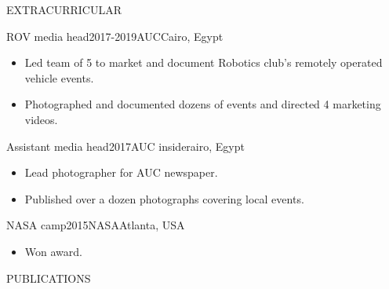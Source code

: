 \documentclass{resume}
\begin{document}
\begin{minipage}[t]{0.49\textwidth}

	\begin{rsection}{\MakeUppercase{extracurricular}}{}

		\begin{rcontent}{ROV media head}{2017-2019}{AUC}{Cairo, Egypt}
			\begin{itemize}
				\item Led team of 5 to market and document Robotics club's remotely operated vehicle events.
				\item Photographed and documented dozens of events and directed 4 marketing videos.
			\end{itemize}
		\end{rcontent}
		\divider
		\begin{rcontent}{Assistant media head}{2017}{AUC insider}{}airo, Egypt
			\begin{itemize}
				\item Lead photographer for AUC newspaper.
				\item Published over a dozen photographs covering local events.
			\end{itemize}
		\end{rcontent}
		\divider
		\begin{rcontent}{NASA camp}{2015}{NASA}{Atlanta, USA}
			\begin{itemize}
				\item Won  award.
			\end{itemize}
		\end{rcontent}

	\end{rsection}

	\begin{rsection}{\MakeUppercase{publications}}{}


\end{rsection}
\end{minipage}
\end{document}
